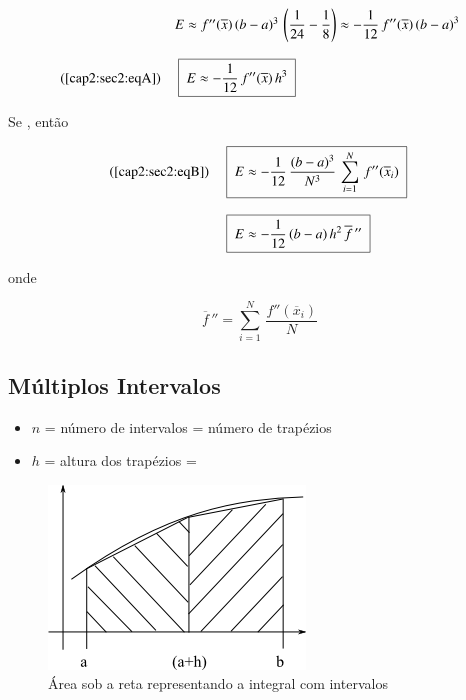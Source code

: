 \[
 \begin{array}{ll}
  & E \approx f''(\overline{x}) \, (b - a)^3 \, \left(\displaystyle \frac{1}{24} - \frac{1}{8}\right) \approx - \displaystyle \frac{1}{12} \, f''(\overline{x}) \, (b - a)^3 \\
  \\
  (\ref{cap2:sec2:eqA}) & \mbox{ \framebox{ $ E \approx - \displaystyle \frac{1}{12} \, f''(\overline{x}) \, h^3 $ } }
 \end{array}
\]

Se , então

\[
 \begin{array}{ll}
  (\ref{cap2:sec2:eqB}) & \mbox{ \framebox{ $ E \approx - \displaystyle \frac{1}{12} \, \frac{(b - a)^3}{N^3} \, \sum_{i=1}^N \, f''(\overline{x}_i) $ } } \\
  \\
  & \mbox{ \framebox{ $ E \approx - \displaystyle \frac{1}{12} \, (b - a) \, h^2 \, \overline{f}\,'' $ } }
 \end{array}
\]

onde

\[
 \overline{f}\,'' = \sum_{i=1}^N \, \frac{f''(\overline{x}_i)}{N}
\]

\subsection{Múltiplos Intervalos}

\begin{itemize}
 \item $n$ = número de intervalos = número de trapézios
\item $h$ = altura dos trapézios = 
\end{itemize}

\begin{figure}[htb]
 \centering
 \includegraphics[scale=0.8]{capitulos/capitulo2/figuras/regra_trapezio2.png}
 \caption{Área sob a reta representando a integral com intervalos}
 \label{fig:regra_trapezio2}
\end{figure}

